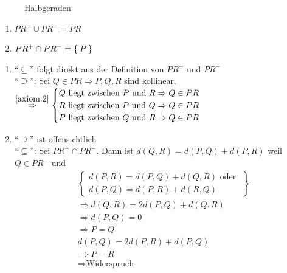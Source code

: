 \begin{figure}[htp]
    \centering
    
    \caption{Halbgeraden}
    \label{fig:halbgeraden}
\end{figure}

\begin{korollar}
    \begin{enumerate}[label=(\roman*)]
        \item $PR^+ \cup PR^- = PR$
        \item $PR^+ \cap PR^- = \Set{P}$
    \end{enumerate}
\end{korollar}

\begin{beweis}\leavevmode
    \begin{enumerate}[label=(\roman*)]
        \item \enquote{$\subseteq$} folgt direkt aus der Definition von $PR^+$ und $PR^-$\\
              \enquote{$\supseteq$}: Sei $Q \in PR \Rightarrow P, Q, R$ 
              sind kollinear.\\
              $\stackrel{\ref{axiom:2}}{\Rightarrow}
              \begin{cases} 
                Q \text{ liegt zwischen } P \text{ und } R \Rightarrow Q \in PR\\
                R \text{ liegt zwischen } P \text{ und } Q \Rightarrow Q \in PR\\
                P \text{ liegt zwischen } Q \text{ und } R \Rightarrow Q \in PR
              \end{cases}$
        \item \enquote{$\supseteq$} ist offensichtlich\\
              \enquote{$\subseteq$}: Sei $PR^+ \cap PR^-$. Dann ist
              $d(Q,R) = d(P,Q) + d(P,R)$ weil $Q \in PR^-$ und
              \begin{align*}
                &\left \{ \begin{array}{l}
                        d(P,R) = d(P,Q) + d(Q,R) \text{ oder }\\
                        d(P,Q) = d(P,R) + d(R,Q)
                       \end{array} \right \}\\
                &\Rightarrow d(Q,R) = 2d(P,Q) + d(Q,R)\\
                &\Rightarrow d(P,Q) = 0\\
                &\Rightarrow P=Q\\
                &d(P,Q) = 2d(P,R) + d(P,Q)\\
                &\Rightarrow P=R\\
                &\Rightarrow \text{Widerspruch}
              \end{align*}
    \end{enumerate}
\end{beweis}

